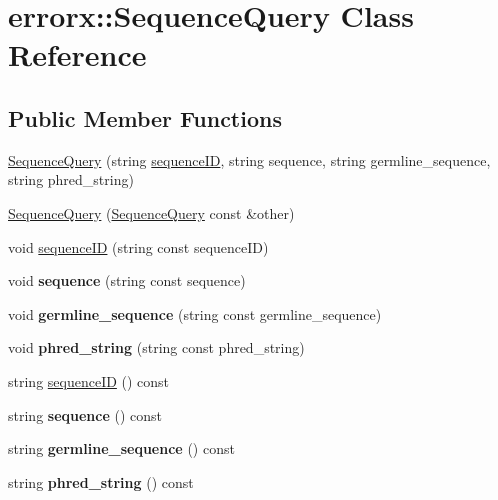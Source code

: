 \hypertarget{classerrorx_1_1_sequence_query}{}\section{errorx\+:\+:Sequence\+Query Class Reference}
\label{classerrorx_1_1_sequence_query}
\subsection*{Public Member Functions}
\begin{DoxyCompactItemize}
\item 
\mbox{\hyperlink{classerrorx_1_1_sequence_query_ac09bbe2cd1bfee32d746cd2fcf3bfc45}{Sequence\+Query}} (string \mbox{\hyperlink{classerrorx_1_1_sequence_query_a29c9365ac24b4f46391564b491592394}{sequence\+ID}}, string sequence, string germline\+\_\+sequence, string phred\+\_\+string)
\item 
\mbox{\hyperlink{classerrorx_1_1_sequence_query_af9ec24bc501bcb57431b20f3189cddfc}{Sequence\+Query}} (\mbox{\hyperlink{classerrorx_1_1_sequence_query}{Sequence\+Query}} const \&other)
\item 
void \mbox{\hyperlink{classerrorx_1_1_sequence_query_a29c9365ac24b4f46391564b491592394}{sequence\+ID}} (string const sequence\+ID)
\item 
\mbox{\label{classerrorx_1_1_sequence_query_a45fd029e132e8bc62aea50947b269e19}} 
void {\bfseries sequence} (string const sequence)
\item 
\mbox{\label{classerrorx_1_1_sequence_query_a9a4d12a688bfc748f2f15af89244e88a}} 
void {\bfseries germline\+\_\+sequence} (string const germline\+\_\+sequence)
\item 
\mbox{\label{classerrorx_1_1_sequence_query_adb9db1b46f6d23f8909d3d6e784fd0aa}} 
void {\bfseries phred\+\_\+string} (string const phred\+\_\+string)
\item 
string \mbox{\hyperlink{classerrorx_1_1_sequence_query_abd2a1128dbdee2be603d130f368bfa32}{sequence\+ID}} () const
\item 
\mbox{\label{classerrorx_1_1_sequence_query_a58b4aba456694e71608189ec5d4ff702}} 
string {\bfseries sequence} () const
\item 
\mbox{\label{classerrorx_1_1_sequence_query_a8fef8a62ba11d3610c2fb8311b50fb99}} 
string {\bfseries germline\+\_\+sequence} () const
\item 
\mbox{\label{classerrorx_1_1_sequence_query_a8459eda44c78b09753ffe3666af2a6a1}} 
string {\bfseries phred\+\_\+string} () const
\end{DoxyCompactItemize}


